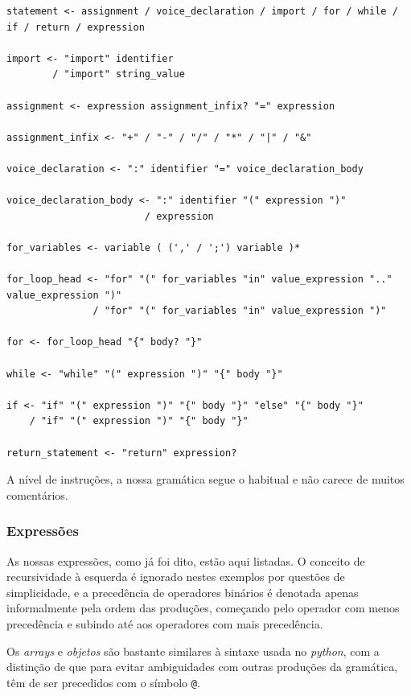 \begin{lstlisting}[caption={Produções de instruções na gramática},language={}]
statement <- assignment / voice_declaration / import / for / while / if / return / expression

import <- "import" identifier
        / "import" string_value

assignment <- expression assignment_infix? "=" expression

assignment_infix <- "+" / "-" / "/" / "*" / "|" / "&"

voice_declaration <- ":" identifier "=" voice_declaration_body

voice_declaration_body <- ":" identifier "(" expression ")"
                        / expression

for_variables <- variable ( (',' / ';') variable )*

for_loop_head <- "for" "(" for_variables "in" value_expression ".." value_expression ")"
               / "for" "(" for_variables "in" value_expression ")"

for <- for_loop_head "{" body? "}"

while <- "while" "(" expression ")" "{" body "}"

if <- "if" "(" expression ")" "{" body "}" "else" "{" body "}"
    / "if" "(" expression ")" "{" body "}"

return_statement <- "return" expression?
\end{lstlisting}
A nível de instruções, a nossa gramática segue o habitual e não carece de muitos comentários.

\subsubsection{Expressões}
As nossas expressões, como já foi dito, estão aqui listadas. O conceito de recursividade à esquerda é ignorado nestes exemplos por questões de simplicidade, e a precedência de operadores binários é denotada apenas informalmente pela ordem das produções, começando pelo operador com menos precedência e subindo até aos operadores com mais precedência.

Os \textit{arrays} e \textit{objetos} são bastante similares à sintaxe usada no \textit{python}, com a distinção de que para evitar ambiguidades com outras produções da gramática, têm de ser precedidos com o símbolo \texttt{@}.

